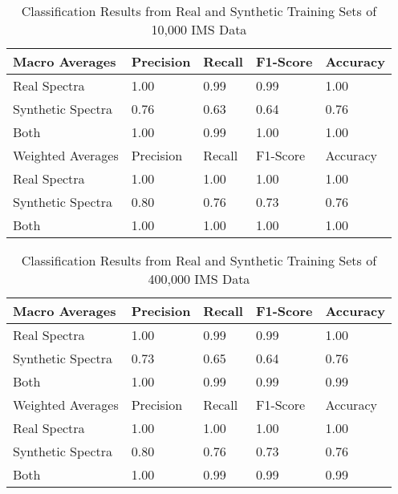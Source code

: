 \documentclass[sigconf]{acmart}
\begin{document}
\begin{table*}
  \caption{Classification Results from Real and Synthetic Training Sets of 10,000 IMS Data}
  \label{tab:commands}
  \begin{tabular}{l|l|l|l|l}
    \toprule
    Macro Averages & Precision & Recall & F1-Score & Accuracy\\
    \midrule
    Real Spectra & 1.00 & 0.99 & 0.99 & 1.00 \\
    Synthetic Spectra & 0.76 & 0.63 & 0.64 & 0.76 \\
    Both & 1.00 & 0.99 & 1.00 & 1.00 \\
    \midrule
    Weighted Averages & Precision & Recall & F1-Score & Accuracy\\
    \midrule
    Real Spectra & 1.00 & 1.00 & 1.00 & 1.00 \\
    Synthetic Spectra & 0.80 & 0.76 & 0.73 & 0.76 \\
    Both & 1.00 & 1.00 & 1.00 & 1.00 \\
    \bottomrule
  \end{tabular}
\end{table*}

\begin{table*}
  \caption{Classification Results from Real and Synthetic Training Sets of 400,000 IMS Data}
  \label{tab:commands}
  \begin{tabular}{l|l|l|l|l}
    \toprule
    Macro Averages & Precision & Recall & F1-Score & Accuracy\\
    \midrule
    Real Spectra & 1.00 & 0.99 & 0.99 & 1.00 \\
    Synthetic Spectra & 0.73 & 0.65 & 0.64 & 0.76 \\
    Both & 1.00 & 0.99 & 0.99 & 0.99 \\
    \midrule
    Weighted Averages & Precision & Recall & F1-Score & Accuracy\\
    \midrule
    Real Spectra & 1.00 & 1.00 & 1.00 & 1.00 \\
    Synthetic Spectra & 0.80 & 0.76 & 0.73 & 0.76 \\
    Both & 1.00 & 0.99 & 0.99 & 0.99 \\
    \bottomrule
  \end{tabular}
\end{table*}
\end{document}
